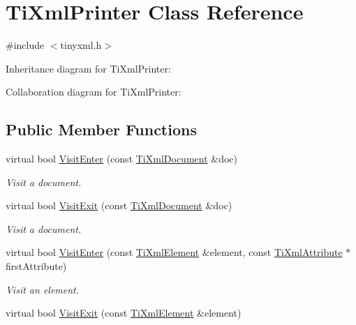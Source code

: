 \hypertarget{class_ti_xml_printer}{
\section{\-Ti\-Xml\-Printer \-Class \-Reference}
\label{class_ti_xml_printer}
}


{\ttfamily \#include $<$tinyxml.\-h$>$}



\-Inheritance diagram for \-Ti\-Xml\-Printer\-:


\-Collaboration diagram for \-Ti\-Xml\-Printer\-:
\subsection*{\-Public \-Member \-Functions}
\begin{DoxyCompactItemize}
\item 
\hypertarget{class_ti_xml_printer_a2ec73087db26ff4d2c4316c56f861db7}{
virtual bool \hyperlink{class_ti_xml_printer_a2ec73087db26ff4d2c4316c56f861db7}{\-Visit\-Enter} (const \hyperlink{class_ti_xml_document}{\-Ti\-Xml\-Document} \&doc)}
\label{class_ti_xml_printer_a2ec73087db26ff4d2c4316c56f861db7}

\begin{DoxyCompactList}\small\item\em \-Visit a document. \end{DoxyCompactList}\item 
\hypertarget{class_ti_xml_printer_a0a636046fa589b6d7f3e5bd025b3f33e}{
virtual bool \hyperlink{class_ti_xml_printer_a0a636046fa589b6d7f3e5bd025b3f33e}{\-Visit\-Exit} (const \hyperlink{class_ti_xml_document}{\-Ti\-Xml\-Document} \&doc)}
\label{class_ti_xml_printer_a0a636046fa589b6d7f3e5bd025b3f33e}

\begin{DoxyCompactList}\small\item\em \-Visit a document. \end{DoxyCompactList}\item 
\hypertarget{class_ti_xml_printer_a6dccaf5ee4979f13877690afe28721e8}{
virtual bool \hyperlink{class_ti_xml_printer_a6dccaf5ee4979f13877690afe28721e8}{\-Visit\-Enter} (const \hyperlink{class_ti_xml_element}{\-Ti\-Xml\-Element} \&element, const \hyperlink{class_ti_xml_attribute}{\-Ti\-Xml\-Attribute} $\ast$first\-Attribute)}
\label{class_ti_xml_printer_a6dccaf5ee4979f13877690afe28721e8}

\begin{DoxyCompactList}\small\item\em \-Visit an element. \end{DoxyCompactList}\item 
\hypertarget{class_ti_xml_printer_ae6a1df8271df4bf62d7873c38e34aa69}{
virtual bool \hyperlink{class_ti_xml_printer_ae6a1df8271df4bf62d7873c38e34aa69}{\-Visit\-Exit} (const \hyperlink{class_ti_xml_element}{\-Ti\-Xml\-Element} \&element)}
\label{class_ti_xml_printer_ae6a1df8271df4bf62d7873c38e34aa69}


\end{DoxyCompactItemize}
